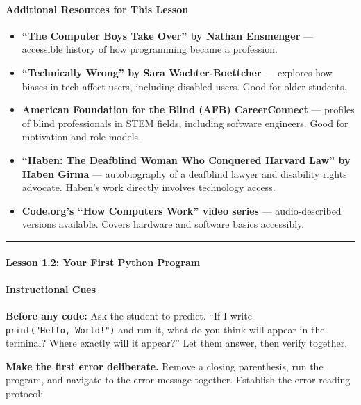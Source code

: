 \documentclass[
  justified,
  openright,
]{tufte-book}
\let\subsubsection\paragraph
\let\paragraph\paragraph
\let\subsubsection\paragraph
\let\paragraph\paragraph
\providecommand{\tightlist}{%
  \setlength{\itemsep}{0pt}\setlength{\parskip}{0pt}}
\begin{document}
\paragraph{Additional Resources for This
Lesson}\label{additional-resources-for-this-lesson}

\begin{itemize}
\tightlist
\item
  \textbf{``The Computer Boys Take Over'' by Nathan Ensmenger} ---
  accessible history of how programming became a profession.
\item
  \textbf{``Technically Wrong'' by Sara Wachter-Boettcher} --- explores
  how biases in tech affect users, including disabled users. Good for
  older students.
\item
  \textbf{American Foundation for the Blind (AFB) CareerConnect} ---
  profiles of blind professionals in STEM fields, including software
  engineers. Good for motivation and role models.
\item
  \textbf{``Haben: The Deafblind Woman Who Conquered Harvard Law'' by
  Haben Girma} --- autobiography of a deafblind lawyer and disability
  rights advocate. Haben's work directly involves technology access.
\item
  \textbf{Code.org's ``How Computers Work'' video series} ---
  audio-described versions available. Covers hardware and software
  basics accessibly.
\end{itemize}

\begin{center}\rule{0.5\linewidth}{0.5pt}\end{center}

\subsubsection{Lesson 1.2: Your First Python
Program}\label{lesson-1.2-your-first-python-program}

\paragraph{Instructional Cues}\label{instructional-cues-3}

\textbf{Before any code:} Ask the student to predict. ``If I write
\texttt{print("Hello,\ World!")} and run it, what do you think will
appear in the terminal? Where exactly will it appear?'' Let them answer,
then verify together.

\textbf{Make the first error deliberate.} Remove a closing parenthesis,
run the program, and navigate to the error message together. Establish
the error-reading protocol:
\end{document}
